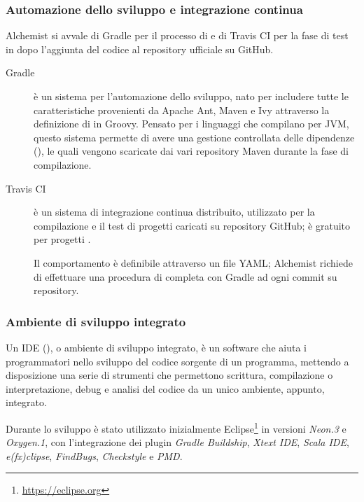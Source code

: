             \subsubsection{Automazione dello sviluppo e integrazione continua}\label{subsub:buildECI}
                Alchemist si avvale di Gradle per il processo di  e di Travis CI per la fase di test in  dopo l'aggiunta del codice al repository ufficiale su GitHub.

                \begin{description}
                    \item[Gradle\footnotemark] è un sistema per l’automazione dello sviluppo, nato per includere tutte le caratteristiche provenienti da Apache Ant, Maven e Ivy attraverso la definizione di  in Groovy. Pensato per i linguaggi che compilano per JVM, questo sistema permette di avere una gestione controllata delle dipendenze (), le quali vengono scaricate dai vari repository Maven durante la fase di compilazione.

                    \item[Travis CI\footnotemark] è un sistema di integrazione continua distribuito, utilizzato per la compilazione e il test di progetti caricati su repository GitHub; è gratuito per progetti .

                    Il comportamento è definibile attraverso un file YAML; Alchemist richiede di effettuare una procedura di  completa con Gradle ad ogni commit su repository.

                \end{description}

            \subsubsection{Ambiente di sviluppo integrato}\label{subsub:IDE}
                Un IDE (), o ambiente di sviluppo integrato, è un software che aiuta i programmatori nello sviluppo del codice sorgente di un programma, mettendo a disposizione una serie di strumenti che permettono scrittura, compilazione o interpretazione, debug e analisi del codice da un unico ambiente, appunto, integrato.

                Durante lo sviluppo è stato utilizzato inizialmente Eclipse\footnote{\url{https://eclipse.org}} in versioni \textit{Neon.3} e \textit{Oxygen.1}, con l’integrazione dei plugin \emph{Gradle Buildship}, \emph{Xtext IDE}, \emph{Scala IDE}, \emph{e(fx)clipse}, \emph{FindBugs}, \emph{Checkstyle} e \emph{PMD}.

